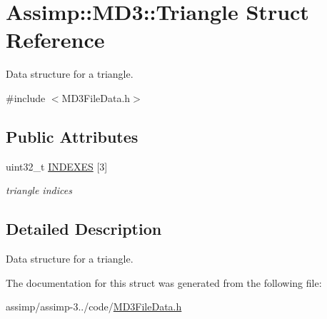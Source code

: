 \hypertarget{struct_assimp_1_1_m_d3_1_1_triangle}{\section{Assimp\+:\+:M\+D3\+:\+:Triangle Struct Reference}
\label{struct_assimp_1_1_m_d3_1_1_triangle}
}


Data structure for a triangle.  




{\ttfamily \#include $<$M\+D3\+File\+Data.\+h$>$}

\subsection*{Public Attributes}
\begin{DoxyCompactItemize}
\item 
\hypertarget{struct_assimp_1_1_m_d3_1_1_triangle_a13c96cffe009d066bdd34058e2a857ea}{uint32\+\_\+t \hyperlink{struct_assimp_1_1_m_d3_1_1_triangle_a13c96cffe009d066bdd34058e2a857ea}{I\+N\+D\+E\+X\+E\+S} \mbox{[}3\mbox{]}}\label{struct_assimp_1_1_m_d3_1_1_triangle_a13c96cffe009d066bdd34058e2a857ea}

\begin{DoxyCompactList}\small\item\em triangle indices \end{DoxyCompactList}\end{DoxyCompactItemize}


\subsection{Detailed Description}
Data structure for a triangle. 

The documentation for this struct was generated from the following file\+:\begin{DoxyCompactItemize}
\item 
assimp/assimp-\/3../code/\hyperlink{_m_d3_file_data_8h}{M\+D3\+File\+Data.\+h}\end{DoxyCompactItemize}
